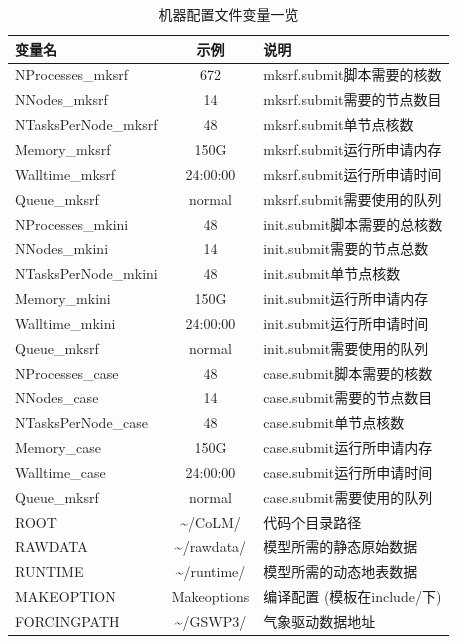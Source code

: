 \begin{table}[!htbp]
\caption{机器配置文件变量一览} \label{table_machineconfig}
\centering \renewcommand{\arraystretch}{1.2}
\begin{tabular}{lcp{}}
\toprule
\textbf{变量名} & \textbf{示例} & \textbf{说明} \\ \midrule
NProcesses\_mksrf & 672 & mksrf.submit脚本需要的核数 \\
NNodes\_mksrf & 14 & mksrf.submit需要的节点数目 \\
NTasksPerNode\_mksrf & 48 & mksrf.submit单节点核数 \\
Memory\_mksrf & 150G & mksrf.submit运行所申请内存 \\
Walltime\_mksrf & 24:00:00 & mksrf.submit运行所申请时间 \\
Queue\_mksrf & normal & mksrf.submit需要使用的队列 \\
NProcesses\_mkini & 48 &init.submit脚本需要的总核数 \\
NNodes\_mkini & 14 & init.submit需要的节点总数 \\
NTasksPerNode\_mkini & 48 & init.submit单节点核数 \\
Memory\_mkini & 150G & init.submit运行所申请内存 \\
Walltime\_mkini & 24:00:00 & init.submit运行所申请时间 \\
Queue\_mksrf & normal & init.submit需要使用的队列 \\
NProcesses\_case & 48 & case.submit脚本需要的核数 \\
NNodes\_case & 14 & case.submit需要的节点数目 \\
NTasksPerNode\_case & 48 & case.submit单节点核数 \\
Memory\_case & 150G & case.submit运行所申请内存 \\
Walltime\_case & 24:00:00 & case.submit运行所申请时间 \\
Queue\_mksrf & normal & case.submit需要使用的队列 \\
ROOT & \textasciitilde/CoLM/ & 代码个目录路径 \\
RAWDATA & \textasciitilde/rawdata/ & 模型所需的静态原始数据 \\
RUNTIME & \textasciitilde/runtime/ & 模型所需的动态地表数据 \\
MAKEOPTION & Makeoptions & 编译配置 (模板在include/下) \\
FORCINGPATH & \textasciitilde/GSWP3/ &气象驱动数据地址 \\
\bottomrule
\end{tabular}
\end{table}

